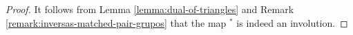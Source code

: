 \documentclass[10pt,a4paper]{amsart}
\newcommand{\degf}[1]{\left|#1\right|}
\newcommand{\fiz}{\triangleleft}
\newcommand{\fizb}{\blacktriangleleft}
\newcommand{\trid}{\triangleright}
\newcommand{\tridb}{\blacktriangleright}
\begin{document}
\begin{proof}


It follows from Lemma \ref{lemma:dual-of-triangles} and Remark \ref{remark:inversas-matched-pair-grupos} that the map $^*$ is indeed an involution. 


\end{proof}
\end{document}
